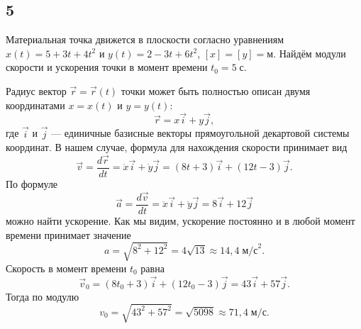 \subsection{5}

Материальная точка движется в плоскости согласно уравнениям $x(t)=5+3t+4t^2$ и $y(t)=2-3t+6t^2$, $[x]=[y]=\text{м}$. Найдём модули скорости и ускорения точки в момент времени $t_0=5\;\text{с}$.

Радиус вектор $\vec r=\vec r(t)$ точки может быть полностью описан двумя координатами $x=x(t)$ и $y=y(t)$:
\[
\vec r=x\vec i+y\vec j,
\]
где $\vec i$ и $\vec j$ --- единичные базисные векторы прямоугольной декартовой системы координат. В нашем случае, формула для нахождения скорости принимает вид
\[
\vec v=\frac{d\vec r}{dt}=\dot x\vec i+\dot y\vec j=(8t+3)\vec i+(12t-3)\vec j.
\]
По формуле
\[
\vec a=\frac{d\vec v}{dt}=\ddot x\vec i+\ddot y\vec j=8\vec i+12\vec j
\]
можно найти ускорение. Как мы видим, ускорение постоянно и в любой момент времени принимает значение
\[
a=\sqrt{8^2+12^2}=4\sqrt{13}\approx14{,}4\;\text{м/с}^2.
\]
Скорость в момент времени $t_0$ равна
\[
\vec v_0=(8t_0+3)\vec i+(12t_0-3)\vec j=43\vec i+57\vec j.
\]
Тогда по модулю
\[
v_0=\sqrt{43^2+57^2}=\sqrt{5098}\approx71{,}4\;\text{м/с}.
\]